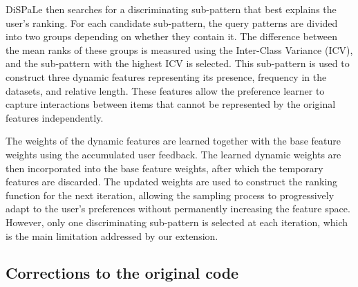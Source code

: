 \documentclass[sigconf]{acmart}
\begin{document}
DiSPaLe then searches for a discriminating sub-pattern that best explains the user's ranking. For each candidate sub-pattern, the query patterns are divided into two groups depending on whether they contain it. The difference between the mean ranks of these groups is measured using the Inter-Class Variance (ICV), and the sub-pattern with the highest ICV is selected. This sub-pattern is used to construct three dynamic features representing its presence, frequency in the datasets, and relative length. These features allow the preference learner to capture interactions between items that cannot be represented by the original features independently. 

The weights of the dynamic features are learned together with the base feature weights using the accumulated user feedback. The learned dynamic weights are then incorporated into the base feature weights, after which the temporary features are discarded. The updated weights are used to construct the ranking function for the next iteration, allowing the sampling process to progressively adapt to the user's preferences without permanently increasing the feature space. However, only one discriminating sub-pattern is selected at each iteration, which is the main limitation addressed by our extension.

\subsection{Corrections to the original code}
\label{subsec:corrections_to_code}
\end{document}

